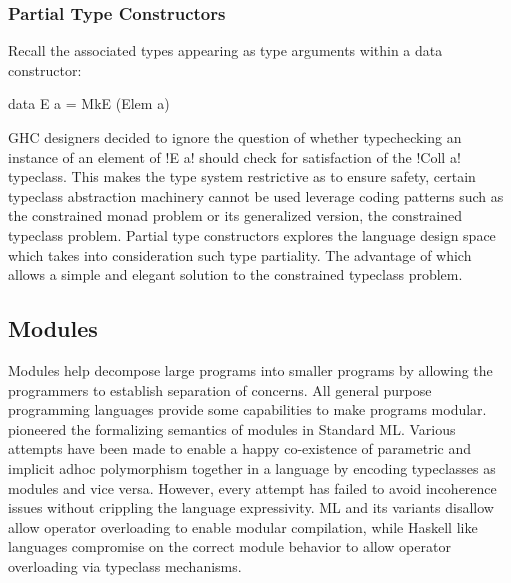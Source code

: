 \documentclass[screen,nonacm]{acmart}
\begin{document}
\subsubsection{Partial Type Constructors}
Recall the associated types appearing as type arguments within a data
constructor:

\begin{CenteredBox}
\begin{code}
data E a = MkE (Elem a)
\end{code}
\end{CenteredBox}

GHC designers decided to ignore the question of whether typechecking
an instance of an element of !E a! should check for satisfaction of
the !Coll a! typeclass. This makes the type system restrictive as to
ensure safety, certain typeclass abstraction machinery cannot be used
leverage coding patterns such as the constrained monad
problem\cite{sculthorpe_constrained-monad_2013} or its generalized
version, the constrained typeclass problem. Partial type
constructors\cite{jones_partial_2019,ingle_partial_2022} explores the language design
space which takes into consideration such type partiality. The
advantage of which allows a simple and elegant solution to the
constrained typeclass problem.

\subsection{Modules}\label{sec:rw-modules}
Modules help decompose large programs into smaller programs by allowing the programmers to establish separation of concerns. All general purpose programming languages provide some capabilities to make programs modular. \citet{macqueen_modules_1984} pioneered the formalizing semantics of modules in Standard ML.
Various attempts\cite{dreyer_modular_2007, wehr_ml_2008, white_modular_2014} have been made to enable a happy co-existence of parametric and implicit adhoc polymorphism together in a language by encoding typeclasses as modules and vice versa. However, every attempt has failed to avoid incoherence issues without crippling the language expressivity. ML and its variants\cite{milner_definition_1997,leroy_ocaml_2023} disallow allow operator overloading to enable modular compilation, while Haskell like languages compromise on the correct module behavior to allow operator overloading via typeclass mechanisms.
\end{document}
